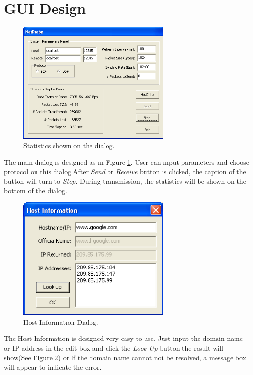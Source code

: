 \documentclass[11pt]{article}
\begin{document}
\section{GUI Design}
\begin{figure}
\centering
\includegraphics[width=3in]{work.png}
\caption{Statistics shown on the dialog.}
\label{fig:work}
\end{figure}
The main dialog is designed as in Figure \ref{fig:work}. User can input parameters and choose protocol on this dialog.After {\em Send} or {\em Receive} button is clicked, the caption of the button will turn to {\em Stop}. During transmission, the statistics will be shown on the bottom of the dialog.

\begin{figure}
\centering
\includegraphics[width=3in]{hostinfo.png}
\caption{Host Information Dialog.}
\label{fig:hostinfo}
\end{figure}
The Host Information is designed very easy to use. Just input the domain name or IP address in the edit box and click the {\em Look Up} button the result will show(See Figure \ref{fig:hostinfo}) or if the domain name cannot not be resolved, a message box will appear to indicate the error.
\end{document}
